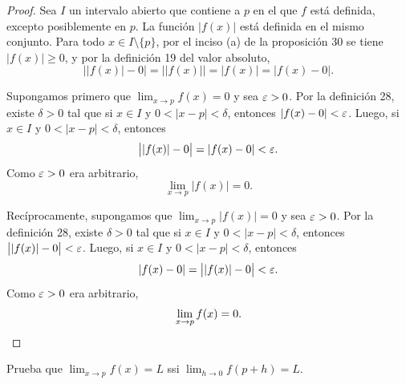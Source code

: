 \documentclass[12pt,a4paper]{article}
\begin{document}
    \begin{proof}
        Sea $I$ un intervalo abierto que contiene a $p$ en el que $f$ está definida, excepto posiblemente en $p$. La función $|f(x)|$ está definida en el mismo conjunto. Para todo $x\in I\setminus\{p\}$, por el inciso (a) de la proposición 30 se tiene $|f(x)|\geq0$, y por la definición 19 del valor absoluto,
        \begin{equation*}
            \bigl||f(x)|-0\bigr|=\bigl||f(x)|\bigr|=|f(x)|=|f(x)-0|.
        \end{equation*}

        Supongamos primero que $\lim_{x\to p}f(x)=0$ y sea $\varepsilon>0$. Por la definición 28, existe $\delta>0$ tal que si $x\in I$ y $0<|x-p|<\delta$, entonces $|f(x)-0|<\varepsilon$. Luego, si $x\in I$ y $0<|x-p|<\delta$, entonces
        \begin{equation*}
            \bigl||f(x)|-0\bigr|=|f(x)-0|<\varepsilon.
        \end{equation*}
        Como $\varepsilon>0$ era arbitrario,
        \begin{equation*}
            \lim_{x\to p}|f(x)|=0.
        \end{equation*}

        Recíprocamente, supongamos que $\lim_{x\to p}|f(x)|=0$ y sea $\varepsilon>0$. Por la definición 28, existe $\delta>0$ tal que si $x\in I$ y $0<|x-p|<\delta$, entonces $\bigl||f(x)|-0\bigr|<\varepsilon$. Luego, si $x\in I$ y $0<|x-p|<\delta$, entonces
        \begin{equation*}
            |f(x)-0|=\bigl||f(x)|-0\bigr|<\varepsilon.
        \end{equation*}
        Como $\varepsilon>0$ era arbitrario,
        \begin{equation*}
            \lim_{x\to p}f(x)=0.\qedhere
        \end{equation*}
    \end{proof}

    \begin{problema}
        Prueba que $\displaystyle\lim_{x\to p}f(x)=L$ ssi $\displaystyle\lim_{h\to0}f(p+h)=L$.
    \end{problema}
\end{document}
